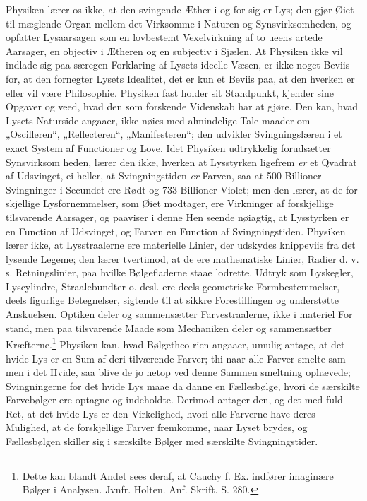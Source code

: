 \documentclass[12pt,a4paper]{book}
\begin{document}
Physiken lærer os ikke, at den svingende Æther i og for sig er Lys; den
gjør Øiet til mæglende Organ mellem det Virksomme i Naturen og
Synsvirksomheden, og opfatter Lysaarsagen som en lovbestemt
Vexelvirkning af to ueens\-%
artede Aarsager, en objectiv i Ætheren og en subjectiv i Sjælen. At
Physiken ikke vil indlade sig paa særegen Forklaring af Lysets ideelle
Væsen, er ikke noget Beviis for, at den fornegter Lysets Idealitet, det
er kun et Beviis paa, at den hverken er eller vil være Philosophie.
Physiken fast\-%
holder sit Standpunkt, kjender sine Opgaver og veed, hvad den som
forskende Videnskab har at gjøre. Den kan, hvad Lysets Naturside
angaaer, ikke nøies med almindelige Tale\-%
maader om „Oscilleren“, „Reflecteren“, „Manifesteren“; den udvikler
Svingningslæren i et exact System af Functioner og Love. Idet Physiken
udtrykkelig forudsætter Synsvirksom\-%
heden, lærer den ikke, hverken at Lysstyrken ligefrem \emph{er} et
Qvadrat af Udsvinget, ei heller, at Svingningstiden \emph{er} Farven,
saa at 500 Billioner Svingninger i Secundet ere Rødt og 733 Billioner
Violet; men den lærer, at de for\-%
skjellige Lysfornemmelser, som Øiet modtager, ere Virkninger af
forskjellige tilsvarende Aarsager, og paaviser i denne Hen\-%
seende nøiagtig, at Lysstyrken er en Function af Udsvinget, og Farven
en Function af Svingningstiden. Physiken lærer ikke, at Lysstraalerne
ere materielle Linier, der udskydes knippeviis fra det lysende Legeme;
den lærer tvertimod, at de ere mathematiske Linier, Radier d. v. s.
Retningslinier, paa hvilke Bølgefladerne staae lodrette. Udtryk som
Lyskegler, Lyscylindre, Straalebundter o. desl. ere deels geometriske
Formbestemmelser, deels figurlige Betegnelser, sigtende til at sikkre
Forestillingen og understøtte Anskuelsen. Optiken deler og sammensætter
Farvestraalerne, ikke i materiel For\-%
stand, men paa tilsvarende Maade som Mechaniken deler og sammensætter
Kræfterne.\footnote{Dette kan blandt Andet sees deraf, at Cauchy
f. Ex. indfører imaginære Bølger i Analysen. Jvnfr. Holten. Anf.
Skrift. S. 280.} Physiken kan, hvad Bølgetheo\-%
rien angaaer, umulig antage, at det hvide Lys er en Sum af deri
tilværende Farver; thi naar alle Farver smelte sam\-%
men i det Hvide, saa blive de jo netop ved denne Sammen\-%
smeltning ophævede; Svingningerne for det hvide Lys maae da danne en
Fællesbølge, hvori de særskilte Farvebølger ere optagne og indeholdte.
Derimod antager den, og det med
fuld Ret, at det hvide Lys er den Virkelighed, hvori alle Farverne have
deres Mulighed, at de forskjellige Farver fremkomme, naar Lyset brydes,
og Fællesbølgen skiller sig i særskilte Bølger med særskilte
Svingningstider.
\end{document}
